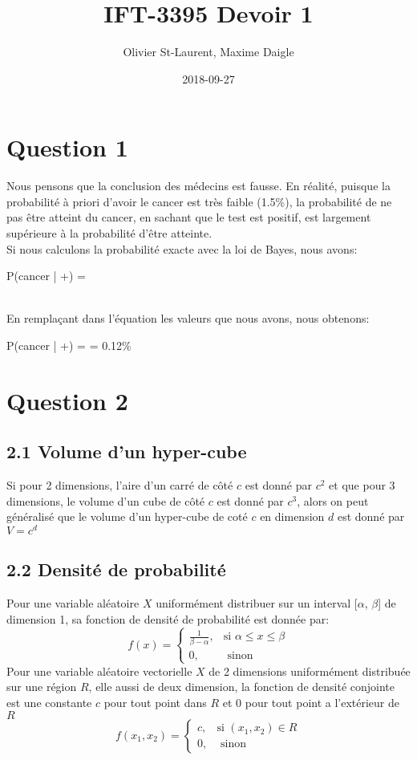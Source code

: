 \documentclass[12pt]{article}
\author{Olivier St-Laurent, Maxime Daigle}
\title{IFT-3395  Devoir 1}
\date{2018-09-27}
\newenvironment{eqs*}{\begin{equation*}\begin{aligned}}{\end{aligned}\end{equation*}}
\begin{document}
\maketitle

\section{Question 1}

Nous pensons que la conclusion des médecins est fausse. En réalité, puisque la probabilité à priori d'avoir le cancer est très faible (1.5\%), la probabilité de ne pas être atteint du cancer, en sachant que le test est positif, est largement supérieure à la probabilité d'être atteinte.
\\[\baselineskip]
Si nous calculons la probabilité exacte avec la loi de Bayes, nous avons:
\begin{eqs*}
P(cancer | +) = 
\end{eqs*}
\\[\baselineskip]
En remplaçant dans l'équation les valeurs que nous avons, nous obtenons:
\begin{eqs*}
P(cancer | +) =  = 0.12\%
\end{eqs*}

\section{Question 2}
\subsection{2.1 Volume d'un hyper-cube}
Si pour 2 dimensions, l'aire d'un carré de côté $c$ est donné par $c^2$ et que pour 3 dimensions, le volume d'un cube de côté $c$ est donné par $c^3$, alors
on peut généralisé que le volume d'un hyper-cube de coté $c$ en dimension $d$ est donné par $V = c^d$


\subsection{2.2 Densité de probabilité}

Pour une variable aléatoire $X$ uniformément distribuer sur un interval [$\alpha$, $\beta$] de dimension 1, sa fonction de densité de probabilité est donnée par:
\[
    f(x) =
	\begin{cases}
        \tfrac{1}{\beta -\alpha}, & \text{si $\alpha \leq x \leq \beta$} \\
        0, & \text{ sinon}
	\end{cases}
\]
Pour une variable aléatoire vectorielle $X$ de 2 dimensions uniformément distribuée sur une région $R$, elle aussi de deux dimension, la fonction
de densité conjointe est une constante $c$ pour tout point dans $R$ et 0 pour tout point a l'extérieur de $R$
\[
    f(x_{1}, x_{2}) =
	\begin{cases}
        c, & \text{si $(x_{1}, x_{2}) \in R$}  \\
        0, & \text{ sinon}
	\end{cases}
\]
\end{document}
